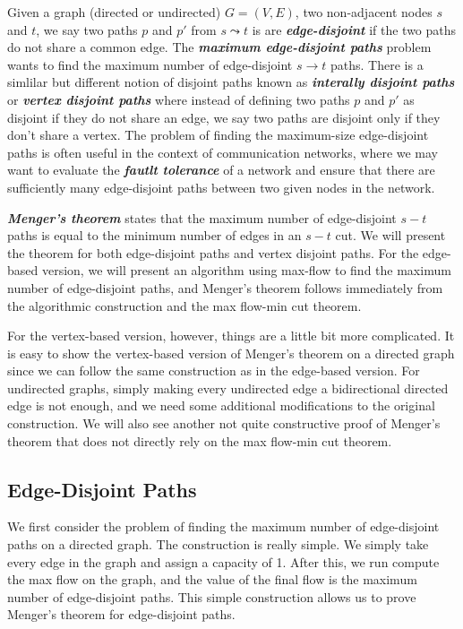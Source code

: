Given a graph (directed or undirected) $G=(V,E)$, two non-adjacent nodes $s$ and $t$, we say two paths $p$ and $p'$ from $s \leadsto t$ is are \textit{\textbf{edge-disjoint}} if the two paths do not share a common edge. The \textit{\textbf{maximum edge-disjoint paths}} problem wants to find the maximum number of edge-disjoint $s \to t$ paths. There is a simlilar but different notion of disjoint paths known as \textit{\textbf{interally disjoint paths}} or \textit{\textbf{vertex disjoint paths}} where instead of defining two paths $p$ and $p'$ as disjoint if they do not share an edge, we say two paths are disjoint only if they don't share a vertex. The problem of finding the maximum-size edge-disjoint paths is often useful in the context of communication networks, where we may want to evaluate the \textit{\textbf{fautlt tolerance}} of a network and ensure that there are sufficiently many edge-disjoint paths between two given nodes in the network.

\textit{\textbf{Menger's theorem}} states that the maximum number of edge-disjoint $s-t$ paths is equal to the minimum number of edges in an $s-t$ cut. We will present the theorem for both edge-disjoint paths and vertex disjoint paths. For the edge-based version, we will present an algorithm using max-flow to find the maximum number of edge-disjoint paths, and Menger's theorem follows immediately from the algorithmic construction and the max flow-min cut theorem.

For the vertex-based version, however, things are a little bit more complicated. It is easy to show the vertex-based version of Menger's theorem on a directed graph since we can follow the same construction as in the edge-based version. For undirected graphs, simply making every undirected edge a bidirectional directed edge is not enough, and we need some additional modifications to the original construction. We will also see another not quite constructive proof of Menger's theorem that does not directly rely on the max flow-min cut theorem.

\subsection{Edge-Disjoint Paths}

We first consider the problem of finding the maximum number of edge-disjoint paths on a directed graph. The construction is really simple. We simply take every edge in the graph and assign a capacity of 1. After this, we run compute the max flow on the graph, and the value of the final flow is the maximum number of edge-disjoint paths. This simple construction allows us to prove Menger's theorem for edge-disjoint paths.


